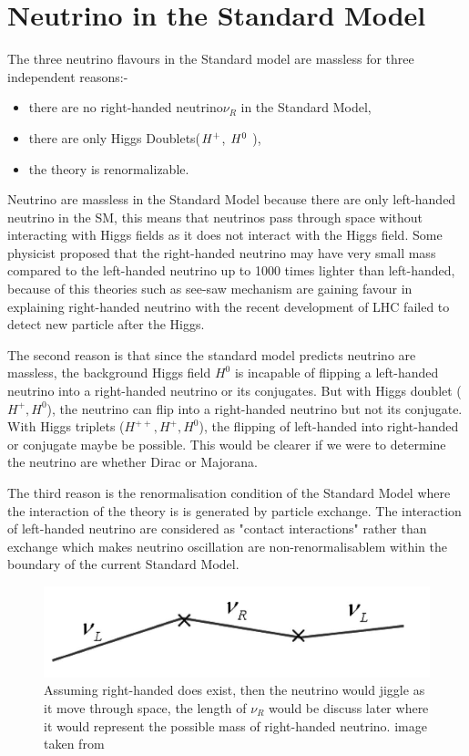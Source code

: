 \documentclass[11pt ,a4paper]{article}
\begin{document}
\section*{Neutrino in the Standard Model}
The three neutrino flavours in the Standard model are massless for three independent reasons:-
\begin{itemize}
	\item there are no right-handed neutrino\(\nu_R \) in the Standard Model,
	\item there are only Higgs Doublets(\(H\textsuperscript{+} \), \(H\textsuperscript{0} \) ),
	\item the theory is renormalizable.\cite{king07} 
\end{itemize}
Neutrino are massless in the Standard Model because there are only left-handed neutrino in the SM, this means that neutrinos pass through space without interacting with Higgs fields as it does not interact with the Higgs field. Some physicist proposed that the right-handed neutrino may have very small mass compared to the left-handed neutrino up to 1000 times lighter than left-handed, because of this theories such as see-saw mechanism are gaining favour in explaining right-handed neutrino with the recent development of LHC failed to detect new particle after the Higgs.

The second reason is that since the standard model predicts neutrino are massless, the background Higgs field \(H^0 \) is incapable of flipping a left-handed neutrino into a right-handed neutrino or its conjugates. But with Higgs doublet (\(H^+, H^0 \)), the neutrino can flip into a right-handed neutrino but not its conjugate. With Higgs triplets (\(H^{++}, H^+, H^0\)), the flipping of left-handed into right-handed or conjugate maybe be possible. This would be clearer if we were to determine the neutrino are whether Dirac or Majorana.\cite{electroweak}

The third reason is the renormalisation condition of the Standard Model where the interaction of the theory is is generated by particle exchange. The interaction of left-handed neutrino are considered as "contact interactions" rather than exchange which makes neutrino oscillation are non-renormalisablem within the boundary of the current Standard Model.\cite{king07}
 \begin{figure}[h]
	\centering
		\includegraphics{righthand.png}
	\caption{Assuming right-handed does exist, then the neutrino would jiggle as it move through space, the length of \(\nu_R \) would be discuss later where it would represent the possible mass of right-handed neutrino. image taken from\cite{king07}}
\end{figure}
\end{document}
